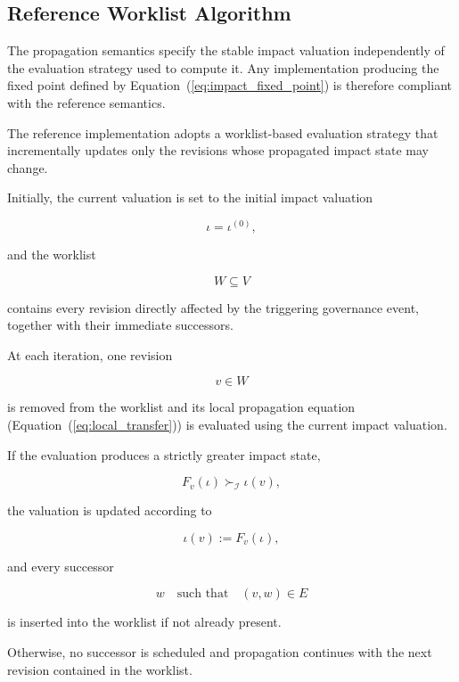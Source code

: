 \documentclass[10pt]{article}
\begin{document}
\subsection{Reference Worklist Algorithm}
\label{appendix:ref_worklist_algo}
The propagation semantics specify the stable impact valuation independently of the evaluation strategy used to compute it. Any implementation producing the fixed point defined by Equation~(\ref{eq:impact_fixed_point}) is therefore
compliant with the reference semantics.

The reference implementation adopts a worklist-based evaluation strategy that incrementally updates only the revisions whose propagated impact state may change.

Initially, the current valuation is set to the initial impact valuation

\[
\iota
=
\iota^{(0)},
\]

and the worklist

\[
W
\subseteq
V
\]

contains every revision directly affected by the triggering governance event, together with their immediate successors.

At each iteration, one revision

\[
v\in W
\]

is removed from the worklist and its local propagation equation
(Equation~(\ref{eq:local_transfer})) is evaluated using the current impact valuation.

If the evaluation produces a strictly greater impact state,

\begin{equation}
	\label{eq:worklist_update}
	F_v(\iota)
	\succ_{\mathcal I}
	\iota(v),
\end{equation}

the valuation is updated according to

\begin{equation}
	\label{eq:worklist_assignment}
	\iota(v)
	:=
	F_v(\iota),
\end{equation}

and every successor

\[
w
\quad
\text{such that}
\quad
(v,w)\in E
\]

is inserted into the worklist if not already present.

Otherwise, no successor is scheduled and propagation continues with the next revision contained in the worklist.
\end{document}
